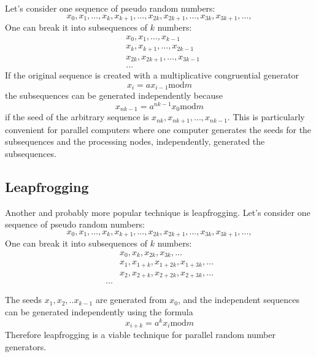 \documentclass[justified,sixbynine]{tufte-book}
\theoremstyle{plain}%
\theoremstyle{definition}
\theoremstyle{remark}
\begin{document}
\begin{fullwidth}
Let's consider one sequence of pseudo random numbers:
\begin{equation}
x_0,x_1,\dots,x_k,x_{k+1},\dots,x_{2k},x_{2k+1},\dots,x_{3k},x_{3k+1},\dots,
\end{equation}
One can break it into subsequences of $k$ numbers:
\begin{align}
&x_0,x_1,\dots,x_{k-1} \\
&x_k,x_{k+1},\dots,x_{2k-1} \\
&x_{2k},x_{2k+1},\dots,x_{3k-1} \\
&\dots
\end{align}
If the original sequence is created with a multiplicative congruential
generator
\begin{equation}
x_i=ax_{i-1}\textrm{mod}m
\end{equation}
the subsequences can be generated independently because
\begin{equation}
x_{nk-1}=a^{nk-1}x_0\textrm{mod}m
\end{equation}
if the seed of the arbitrary sequence is $x_{nk},x_{nk+1},\dots,x_{nk-1}$. This
is particularly convenient for parallel computers where one computer
generates the seeds for the subsequences and the processing nodes,
independently, generated the subsequences.

\goodbreak\subsection{Leapfrogging}

Another and probably more popular technique is leapfrogging.
Let's consider one sequence of pseudo random numbers:
\begin{equation}
x_0,x_1,\dots,x_k,x_{k+1},\dots,x_{2k},x_{2k+1},\dots,x_{3k},x_{3k+1},\dots,
\end{equation}
One can break it into subsequences of $k$ numbers:
\begin{align}
&x_0,x_k,x_{2k},x_{3k},\dots \\
&x_1,x_{1+k},x_{1+2k},x_{1+3k},\dots \\
&x_2,x_{2+k},x_{2+2k},x_{2+3k},\dots \\
\dots&
\end{align}

The seeds $x_1,x_2,..x_{k-1}$ are generated from $x_0$, and the independent
sequences can be generated independently using the formula
\begin{equation}
x_{i+k}=a^kx_i\textrm{mod}m
\end{equation}
Therefore leapfrogging is a viable technique for parallel random number
generators.


\end{fullwidth}
\end{document}
